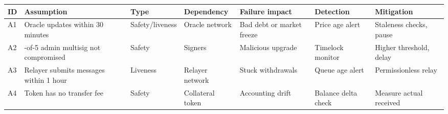 {\def\LTcaptype{none} %
\begin{longtable}[]{@{}
  >{\raggedright\arraybackslash}p{}
  >{\raggedright\arraybackslash}p{}
  >{\raggedright\arraybackslash}p{}
  >{\raggedright\arraybackslash}p{}
  >{\raggedright\arraybackslash}p{}
  >{\raggedright\arraybackslash}p{}
  >{\raggedright\arraybackslash}p{}@{}}
\toprule\noalign{}
\begin{minipage}[b]{\linewidth}\raggedright
ID
\end{minipage} & \begin{minipage}[b]{\linewidth}\raggedright
Assumption
\end{minipage} & \begin{minipage}[b]{\linewidth}\raggedright
Type
\end{minipage} & \begin{minipage}[b]{\linewidth}\raggedright
Dependency
\end{minipage} & \begin{minipage}[b]{\linewidth}\raggedright
Failure impact
\end{minipage} & \begin{minipage}[b]{\linewidth}\raggedright
Detection
\end{minipage} & \begin{minipage}[b]{\linewidth}\raggedright
Mitigation
\end{minipage} \\
\midrule\noalign{}
\endhead
\bottomrule\noalign{}
\endlastfoot
A1 & Oracle updates within 30 minutes & Safety/liveness & Oracle network
& Bad debt or market freeze & Price age alert & Staleness checks,
pause \\
A2 & 3-of-5 admin multisig not compromised & Safety & Signers &
Malicious upgrade & Timelock monitor & Higher threshold, delay \\
A3 & Relayer submits messages within 1 hour & Liveness & Relayer network
& Stuck withdrawals & Queue age alert & Permissionless relay \\
A4 & Token has no transfer fee & Safety & Collateral token & Accounting
drift & Balance delta check & Measure actual received \\
\end{longtable}
}

